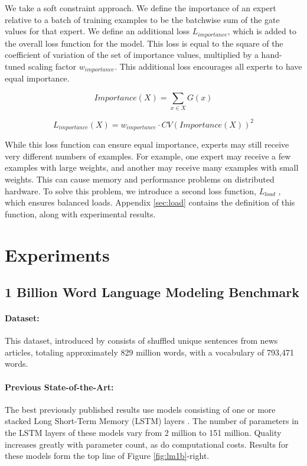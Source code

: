\documentclass{article}
\begin{document}
We take a soft constraint approach.  We define the importance of an expert relative to a batch of training examples to be the batchwise sum of the gate values for that expert.  We define an additional loss $L_{importance}$, which is added to the overall loss function for the model.  This loss is equal to the square of the coefficient of variation of the set of importance values, multiplied by a hand-tuned scaling factor $w_{importance}$.  This additional loss encourages all experts to have equal importance.

\begin{equation}\label{eq:gateloss}
Importance(X) = \sum_{x \in X}G(x)
\end{equation}

\begin{equation}\label{eq:importanceloss}
L_{importance}(X) = w_{importance} \cdot CV(Importance(X))^2
\end{equation}

While this loss function can ensure equal importance, experts may still receive very different numbers of examples.  For example, one expert may receive a few examples with large weights, and another may receive many examples with small weights.  This can cause memory and performance problems on distributed hardware.  To solve this problem, we introduce a second loss function, $L_{load}$ , which ensures balanced loads.  Appendix \ref{sec:load} contains the definition of this function, along with experimental results.

\section{Experiments}

\subsection{1 Billion Word Language Modeling Benchmark}\label{sec:lm}

\paragraph{Dataset:} This dataset, introduced by \citep{chelba2013one} consists of shuffled unique sentences from news articles, totaling approximately 829 million words, with a vocabulary of 793,471 words.

\paragraph{Previous State-of-the-Art:} The best previously published results \citep{RafalNoam16} use models consisting of one or more stacked Long Short-Term Memory (LSTM) layers \citep{Hochreiter:1997:LSM,Gers:2000:LFC}.  The number of parameters in the LSTM layers of these models vary from 2 million to 151 million.  Quality increases greatly with parameter count, as do computational costs.  Results for these models form the top line of Figure \ref{fig:lm1b}-right.
\end{document}

